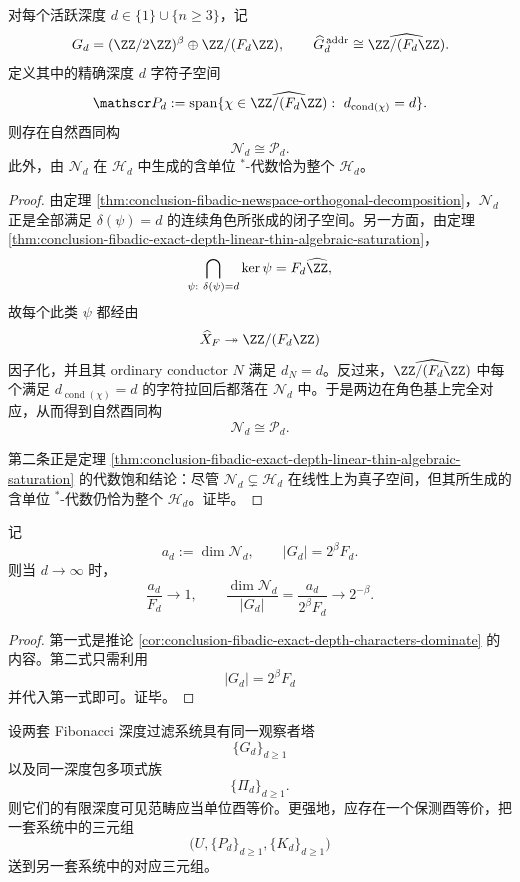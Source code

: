 \begin{theorem}[精确深度新空间与最小忠实观察者的字符对偶]\label{thm:conclusion-fibadic-newspace-minimal-observer-duality}
对每个活跃深度 \(d\in\{1\}\cup\{n\ge 3\}\)，记
\[
G_d=(\ZZ/2\ZZ)^\beta\oplus \ZZ/(F_d\ZZ),
\qquad
\widehat G_d^{\,\mathrm{addr}}\cong \widehat{\ZZ/(F_d\ZZ)}.
\]
定义其中的精确深度 \(d\) 字符子空间
\[
\mathscr P_d
:=
\operatorname{span}\{\chi\in \widehat{\ZZ/(F_d\ZZ)}:\ d_{\operatorname{cond}(\chi)}=d\}.
\]
则存在自然酉同构
\[
\mathcal N_d\cong \mathscr P_d.
\]
此外，由 \(\mathcal N_d\) 在 \(\mathcal H_d\) 中生成的含单位 \(^*\)-代数恰为整个 \(\mathcal H_d\)。
\end{theorem}
\begin{proof}
由定理 \ref{thm:conclusion-fibadic-newspace-orthogonal-decomposition}，\(\mathcal N_d\) 正是全部满足 \(\delta(\psi)=d\) 的连续角色所张成的闭子空间。另一方面，由定理 \ref{thm:conclusion-fibadic-exact-depth-linear-thin-algebraic-saturation}，
\[
\bigcap_{\psi:\ \delta(\psi)=d}\ker\psi
=
F_d\widehat{\ZZ},
\]
故每个此类 \(\psi\) 都经由
\[
\widehat X_F\twoheadrightarrow \ZZ/(F_d\ZZ)
\]
因子化，并且其 ordinary conductor \(N\) 满足 \(d_N=d\)。反过来，\(\widehat{\ZZ/(F_d\ZZ)}\) 中每个满足 \(d_{\operatorname{cond}(\chi)}=d\) 的字符拉回后都落在 \(\mathcal N_d\) 中。于是两边在角色基上完全对应，从而得到自然酉同构
\[
\mathcal N_d\cong \mathscr P_d.
\]

第二条正是定理 \ref{thm:conclusion-fibadic-exact-depth-linear-thin-algebraic-saturation} 的代数饱和结论：尽管 \(\mathcal N_d\subsetneq \mathcal H_d\) 在线性上为真子空间，但其所生成的含单位 \(^*\)-代数仍恰为整个 \(\mathcal H_d\)。证毕。
\end{proof}

\begin{corollary}\label{cor:conclusion-fibadic-minimal-observer-primitive-density}
记
\[
a_d:=\dim \mathcal N_d,
\qquad
|G_d|=2^\beta F_d.
\]
则当 \(d\to\infty\) 时，
\[
\frac{a_d}{F_d}\longrightarrow 1,
\qquad
\frac{\dim \mathcal N_d}{|G_d|}
=
\frac{a_d}{2^\beta F_d}
\longrightarrow
2^{-\beta}.
\]
\end{corollary}
\begin{proof}
第一式是推论 \ref{cor:conclusion-fibadic-exact-depth-characters-dominate} 的内容。第二式只需利用
\[
|G_d|=2^\beta F_d
\]
并代入第一式即可。证毕。
\end{proof}

\begin{conjecture}\label{conj:conclusion-fibadic-observer-tower-tannakian-reconstruction}
设两套 Fibonacci 深度过滤系统具有同一观察者塔
\[
\{G_d\}_{d\ge 1}
\]
以及同一深度包多项式族
\[
\{\Pi_d\}_{d\ge 1}.
\]
则它们的有限深度可见范畴应当单位酉等价。更强地，应存在一个保测酉等价，把一套系统中的三元组
\[
\bigl(U,\{P_d\}_{d\ge 1},\{K_d\}_{d\ge 1}\bigr)
\]
送到另一套系统中的对应三元组。
\end{conjecture}

